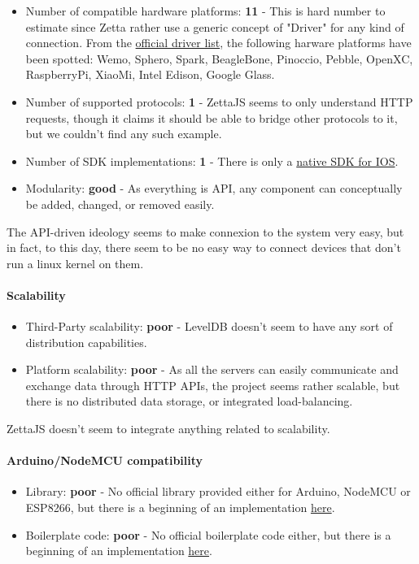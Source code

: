 \documentclass{article}
\begin{document}
\begin{itemize}
\item Number of compatible hardware platforms: \textbf{11} - This is hard number to estimate since Zetta rather use a generic concept of "Driver" for any kind of connection. From the \href{http://www.zettajs.org/modules/}{official driver list}, the following harware platforms have been spotted: Wemo, Sphero, Spark, BeagleBone, Pinoccio, Pebble, OpenXC, RaspberryPi, XiaoMi, Intel Edison, Google Glass.
\item Number of supported protocols: \textbf{1} - ZettaJS seems to only understand HTTP requests, though it claims it should be able to bridge other protocols to it, but we couldn't find any such example.
\item Number of SDK implementations: \textbf{1} - There is only a \href{https://github.com/zettajs/ZettaKit}{native SDK for IOS}.
\item Modularity: \textbf{good} - As everything is API, any component can conceptually be added, changed, or removed easily.
\end{itemize}

The API-driven ideology seems to make connexion to the system very easy, but in fact, to this day, there seem to be no easy way to connect devices that don't run a linux kernel on them.

\paragraph{Scalability}

\begin{itemize}
\item Third-Party scalability: \textbf{poor} - LevelDB doesn't seem to have any sort of distribution capabilities.
\item Platform scalability: \textbf{poor} - As all the servers can easily communicate and exchange data through HTTP APIs, the project seems rather scalable, but there is no distributed data storage, or integrated load-balancing.
\end{itemize}

ZettaJS doesn't seem to integrate anything related to scalability.

\paragraph{Arduino/NodeMCU compatibility}

\begin{itemize}
\item Library: \textbf{poor} - No official library provided either for Arduino, NodeMCU or ESP8266, but there is a beginning of an implementation \href{https://github.com/zettajs/zetta-cli/tree/master/sample/basic-arduino}{here}.
\item Boilerplate code: \textbf{poor} - No official boilerplate code either, but there is a beginning of an implementation \href{https://github.com/zettajs/zetta-arduino}{here}.
\end{itemize}
\end{document}
